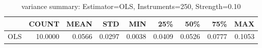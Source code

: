 \begin{table}[ht]
\centering
\caption{variance summary: Estimator=OLS, Instruments=250, Strength=0.10}
\begin{tabular}{lrrrrrrrr}
\toprule
 & COUNT & MEAN & STD & MIN & 25\% & 50\% & 75\% & MAX \\
\midrule
OLS & 10.0000 & 0.0566 & 0.0297 & 0.0038 & 0.0409 & 0.0526 & 0.0777 & 0.1053 \\
\bottomrule
\end{tabular}
\end{table}
